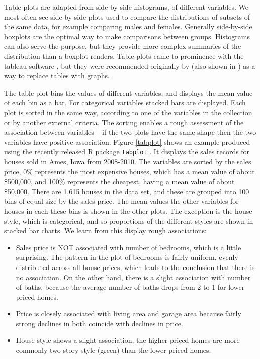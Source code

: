 \documentclass{article}
\begin{document}
\begin{itemize}
Table plots are adapted from side-by-side histograms, of different variables. We most often see side-by-side plots used to compare the distributions of subsets of the same data, for example comparing males and females. Generally side-by-side boxplots are the optimal way to make comparisons between groups. Histograms can also serve the purpose, but they provide more complex summaries of the distribution than a boxplot renders. Table plots came to prominence with the tableau software \citep{tableau}, but they were recommended originally by \citet{carr-grey} (also shown in \citet{carr-tabplot}) as a way to replace tables with graphs.

The table plot bins the values of different variables, and displays the mean value of each bin as a bar. For categorical variables stacked bars are displayed. Each plot is sorted in the same way, according to one of the variables in the collection or by another external criteria. The sorting enables a rough assessment of the association between variables -- if the two plots have the same shape then the two variables have positive association. Figure \ref{tabplot} shows an example produced using the recently released R package {\tt tabplot} \citep{tennekes2012package}. It displays the sales records for houses sold in Ames, Iowa from 2008-2010. The variables are sorted by the sales price, 0\% represents the most expensive houses, which has a mean value of about \$500,000, and 100\% represents the cheapest, having a mean value of about \$50,000. There are 1,615 houses in the data set, and these are grouped into 100 bins of equal size by the sales price. The mean values the other variables for houses in each these bins is shown in the other plots. The exception is the house style, which is categorical, and so proportions of the different styles are shown in stacked bar charts. We learn from this display rough associations:

\begin{itemize} \itemsep 0in
\item Sales price is NOT associated with number of bedrooms, which is a little surprising. The pattern in the plot of bedrooms is fairly uniform, evenly distributed across all house prices, which leads to the conclusion that there is no association. On the other hand, there is a slight association with number of baths, because the average number of baths drops from 2 to 1 for lower priced homes.
\item Price is closely associated with living area and garage area because fairly strong declines in both coincide with declines in price.
\item House style shows a slight association, the higher priced homes are more commonly two story style (green) than the lower priced homes.
\end{itemize}


\end{itemize}
\end{document}
